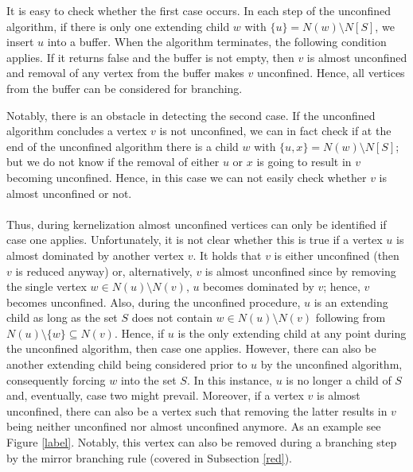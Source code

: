 \documentclass[]{article}
\begin{document}
It is easy to check whether the first case occurs. In each step of the unconfined algorithm, if there is only one extending child $w$ with $\{u\} = N(w) \setminus N[S]$, we insert $u$ into a buffer. When the algorithm terminates, the following condition applies. If it returns false and the buffer is not empty, then $v$ is almost unconfined and removal of any vertex from the buffer makes $v$ unconfined. Hence, all vertices from the buffer can be considered for branching.

Notably, there is an obstacle in detecting the second case. If the unconfined algorithm concludes a vertex $v$ is not unconfined, we can in fact check if at the end of the unconfined algorithm there is a child $w$ with $\{u,x\} = N(w) \setminus N[S]$; but we do not know if the removal of either $u$ or $x$ is going to result in $v$ becoming unconfined. Hence, in this case we can not easily check whether $v$ is almost unconfined or not.

\paragraph{}
Thus, during kernelization almost unconfined vertices can only be identified if case one applies. Unfortunately, it is not clear whether this is true if a vertex $u$ is almost dominated by another vertex $v$. It holds that $v$ is either unconfined (then $v$ is reduced anyway) or, alternatively, $v$ is almost unconfined since by removing the single vertex $w \in N(u)\setminus N(v)$, $u$ becomes dominated by $v$; hence, $v$ becomes unconfined. Also, during the unconfined procedure, $u$ is an extending child as long as the set $S$ does not contain $w\in N(u)\setminus N(v)$ following from $N(u)\setminus\{w\}\subseteq N(v)$. Hence, if $u$ is the only extending child at any point during the unconfined algorithm, then case one applies. However, there can also be another extending child being considered prior to $u$ by the unconfined algorithm, consequently forcing $w$ into the set $S$. In this instance, $u$ is no longer a child of $S$ and, eventually, case two might prevail. 
Moreover, if a vertex $v$ is almost unconfined, there can also be a vertex such that removing the latter results in $v$ being neither unconfined nor almost unconfined anymore. As an example see Figure \ref{label}. Notably, this vertex can also be removed during a branching step by the mirror branching rule (covered in Subsection \ref{red}).
\end{document}
